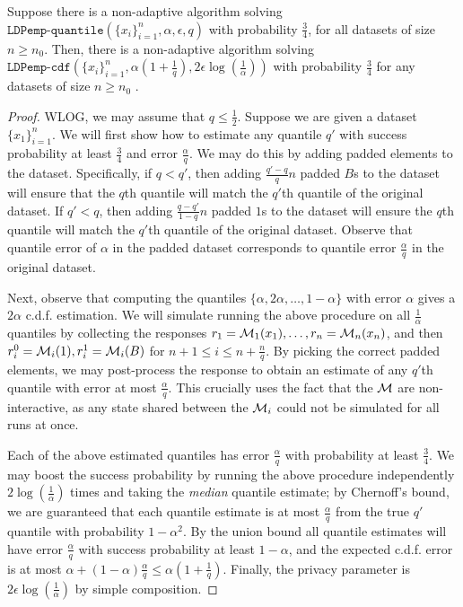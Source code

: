 \begin{lemma}\label{lem:reduct}
    Suppose there is a non-adaptive algorithm solving $\texttt{LDPemp-quantile}(\{x_i\}_{i=1}^{n}, \alpha, \epsilon, q)$ with probability $\frac{3}{4}$, for all datasets of size $n \geq n_0$. Then, there is a non-adaptive algorithm solving $\texttt{LDPemp-cdf}(\{x_i\}_{i=1}^{n}, \alpha (1 + \frac{1}{q}), 2\epsilon \log(\frac{1}{\alpha}))$  with probability $\frac{3}{4}$ for any datasets of size $n \geq n_0$ . 
\end{lemma}

\begin{proof}
    WLOG, we may assume that $q \leq \frac{1}{2}$.
    Suppose we are given a dataset $\{x_1\}_{i=1}^n$. We will first show how to estimate any quantile $q'$ with success probability at least $\frac{3}{4}$ and error $\frac{\alpha}{q}$. We may do this by adding padded elements to the dataset. Specifically, if $q < q'$, then adding $\frac{q' - q}{q}n$ padded $B$s to the dataset will ensure that the $q$th quantile will match the $q'$th quantile of the original dataset. If  $q' < q$, then adding $\frac{q - q'}{1-q}n$ padded $1$s to the dataset will ensure the $q$th quantile will match the $q'$th quantile of the original dataset.
    Observe that quantile error of $\alpha$ in the padded dataset corresponds to quantile error $\frac{\alpha}{q}$ in the original dataset.


    Next, observe that computing the quantiles $\{\alpha, 2\alpha, \ldots, 1-\alpha\}$ with error $\alpha$ gives a $2\alpha$ c.d.f. estimation. We will simulate running the above procedure on all $\frac{1}{\alpha}$ quantiles by collecting the responses $r_1 = \mathcal{M}_1(x_1), \ldots, r_n = \mathcal{M}_n(x_n)$, and then $r_i^0 = \mathcal{M}_i(1), r_i^1 = \mathcal{M}_i(B)$ for $n+1 \leq i \leq n + \frac{n}{q}$. By picking the correct padded elements, we may post-process the response to obtain an estimate of any $q'$th quantile with error at most $\frac{\alpha}{q}$. This crucially uses the fact that the $\mathcal{M}$ are non-interactive, as any state shared between the $\mathcal{M}_i$ could not be simulated for all runs at once.

    Each of the above estimated quantiles has error $\frac{\alpha}{q}$ with probability at least $\frac{3}{4}$. We may boost the success probability by running the above procedure independently $2 \log(\frac{1}{\alpha})$ times and taking the \emph{median} quantile estimate; by Chernoff's bound, we are guaranteed that each quantile estimate is at most $\frac{\alpha}{q}$ from the true $q'$ quantile with probability $1-\alpha^2$. By the union bound all quantile estimates will have error $\frac{\alpha}{q}$ with success probability at least $1-\alpha$, and the expected c.d.f. error is at most $\alpha + (1-\alpha)\frac{\alpha}{q} \leq \alpha (1 + \frac{1}{q})$. Finally, the privacy parameter is $2\epsilon \log (\frac{1}{\alpha})$ by simple composition.
\end{proof}


